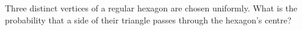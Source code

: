 Three distinct vertices of a regular hexagon are chosen uniformly. What is the probability that a side of their triangle passes through the hexagon's centre?
